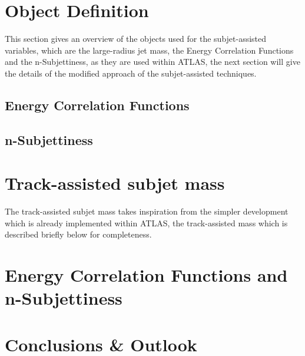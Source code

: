 \documentclass[UKenglish,texlive=2013]{\ATLASLATEXPATH atlasdoc}
\begin{document}
\section{Object Definition}
\label{sec:objdef}

This section gives an overview of the objects used for the subjet-assisted variables, which are the large-radius jet mass, the Energy Correlation Functions and the n-Subjettiness, as they are used within ATLAS, the next section will give the details of the modified approach of the subjet-assisted techniques.




\subsection{Energy Correlation Functions}

\subsection{n-Subjettiness}

\section{Track-assisted subjet mass}
\label{sec:mtas}
The track-assisted subjet mass takes inspiration from the simpler development which is already implemented within ATLAS, the track-assisted mass which is described briefly below for completeness.



\section{Energy Correlation Functions and n-Subjettiness}
\label{sec:ECFnS}



\section{Conclusions \& Outlook}
\label{sec:conclusions}
\end{document}
